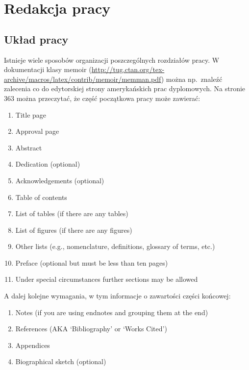 
\chapter{Redakcja pracy}
\section{Układ pracy}
Istnieje wiele sposobów organizacji poszczególnych rozdziałów pracy. W dokumentacji klasy memoir (\url{http://tug.ctan.org/tex-archive/macros/latex/contrib/memoir/memman.pdf}) można np.\ znaleźć zalecenia co do edytorskiej strony amerykańskich prac dyplomowych. Na stronie 363 można przeczytać, że część początkowa pracy może zawierać:
\begin{enumerate}
\item Title page
\item Approval page
\item Abstract
\item Dedication (optional)
\item Acknowledgements (optional)
\item Table of contents
\item List of tables (if there are any tables)
\item List of figures (if there are any figures)
\item Other lists (e.g., nomenclature, definitions, glossary of terms, etc.)
\item Preface (optional but must be less than ten pages)
\item Under special circumstances further sections may be allowed
\end{enumerate}
A dalej kolejne wymagania, w tym informacje o zawartości części końcowej:
\begin{enumerate}
\item Notes (if you are using endnotes and grouping them at the end)
\item References (AKA ‘Bibliography’ or ‘Works Cited’)
\item Appendices
\item Biographical sketch (optional)
\end{enumerate}

